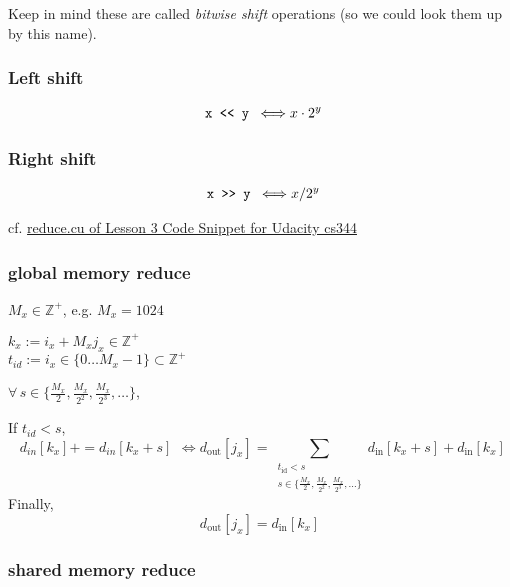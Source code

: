 \documentclass[10pt]{amsart}
\begin{document}
\begin{multicols*}{2}
Keep in mind these are called \emph{bitwise shift} operations (so we could look them up by this name).

\subsubsection*{Left shift}

\[
\begin{gathered}
  \verb| x << y | \Longleftrightarrow x \cdot 2^y 
  \end{gathered}
\]

\subsubsection*{Right shift}

\[
\begin{gathered}
  \verb| x >> y | \Longleftrightarrow x / 2^y 
  \end{gathered}
\]

cf. \href{https://github.com/udacity/cs344/blob/master/Lesson Code Snippets/Lesson 3 Code Snippets/reduce.cu}{reduce.cu of Lesson 3 Code Snippet for Udacity cs344}


\subsubsection*{global memory reduce}

$M_x \in \mathbb{Z}^+$, e.g. $M_x = 1024$

$k_x := i_x + M_x j_x \in \mathbb{Z}^+$ \\
$t_{id} := i_x \in \lbrace 0 \dots M_x-1\rbrace \subset \mathbb{Z}^+$

$\forall \, s \in \lbrace \frac{M_x}{2}, \frac{M_x}{2^2}, \frac{M_x}{2^3}, \dots \rbrace $, 

If $t_{id} < s$,
\[
\begin{gathered}
d_{in}[k_x] += d_{in}[k_x + s]
\end{gathered} \Longleftrightarrow d_{\text{out}}[j_x] = \sum_{ \substack{ t_{\text{id}} < s \\ s \in \lbrace \frac{M_x}{2}, \frac{M_x}{2^2}, \frac{M_x}{2^3} , \dots \rbrace } } d_{\text{in}}[k_x + s] + d_{\text{in}}[k_x]
\]
Finally,
\[
d_{\text{out}}[j_x] = d_{\text{in}}[k_x]
\]

\subsubsection*{shared memory reduce }


\end{multicols*}
\end{document}
